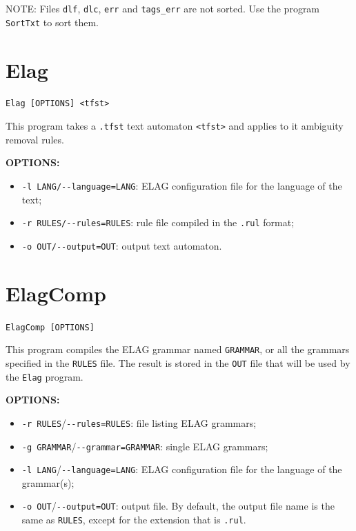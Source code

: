 \bigskip
\noindent NOTE: Files \verb+dlf+, \verb+dlc+, \verb+err+ and \verb+tags_err+ are not sorted. Use the
program \verb+SortTxt+ to sort them.



\section{Elag}
\verb+Elag [OPTIONS] <tfst>+

\bigskip
\noindent This program takes a \verb+.tfst+ text automaton \verb+<tfst>+ and
applies to it ambiguity removal rules.

\bigskip
\noindent \textbf{OPTIONS:}
\begin{itemize}
  \item \verb+-l LANG/--language=LANG+: ELAG configuration file for the language of the
  text;
  \item \verb+-r RULES/--rules=RULES+: rule file compiled in the \verb+.rul+
  format; 
  \item \verb+-o OUT/--output=OUT+: output text automaton.
\end{itemize}







\section{ElagComp}
\verb+ElagComp [OPTIONS]+

\bigskip
\noindent This program compiles the ELAG grammar named \verb+GRAMMAR+, or all
the grammars specified in the \verb+RULES+ file. The result is stored in the
\verb+OUT+ file that will be used by the \verb+Elag+ program.

\bigskip
\noindent \textbf{OPTIONS:}
\begin{itemize}
  \item \verb+-r RULES+/\verb+--rules=RULES+: file listing ELAG grammars;
  \item \verb+-g GRAMMAR+/\verb+--grammar=GRAMMAR+: single ELAG grammars;
  \item \verb+-l LANG+/\verb+--language=LANG+: ELAG configuration file for the language of the grammar(s);
  \item \verb+-o OUT+/\verb+--output=OUT+: output file. By default, the output file name is 
        the same as \verb+RULES+, except for the extension that is
        \verb+.rul+.
\end{itemize}








